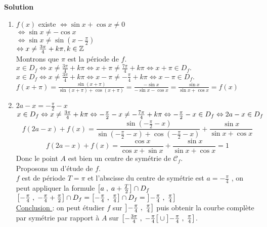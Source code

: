 \textbf{\color{blue}Solution}
\begin{enumerate}
\item $ f(x) $ existe    $\Leftrightarrow \sin x+\cos x \neq 0  $\\
 $\Leftrightarrow \sin x \neq -\cos x $\\
 $\Leftrightarrow \sin x \neq \sin (x- \frac{\pi}{2}) $\\
 $ \Leftrightarrow x\neq \frac{3\pi}{4}+ k\pi , k\in \mathbb{Z}$\\
 Montrons que $ \pi $ est la période de $ f. $\\
 $ x \in D_{f}\Leftrightarrow x\neq \frac{3\pi}{4}+ k\pi \Leftrightarrow x+\pi\neq \frac{7\pi}{4}+ k\pi \Leftrightarrow x+\pi\in D_{f}.$\\
  $ x \in D_{f}\Leftrightarrow x\neq \frac{3\pi}{4}+ k\pi \Leftrightarrow x-\pi\neq -\frac{\pi}{4}+ k\pi \Leftrightarrow x-\pi\in D_{f}.$\\
 $ f(x+\pi)=\frac{\sin (x+\pi) }{\sin (x+\pi)+\cos (x+\pi)}= \frac{-\sin x }{-\sin x-\cos x}=\frac{\sin x }{\sin x+\cos x}=f(x)$
 \item $ 2a-x=-\frac{\pi}{2}-x $\\
  $ x \in D_{f}\Leftrightarrow x\neq \frac{3\pi}{4}+ k\pi \Leftrightarrow -\frac{\pi}{2}-x \neq -\frac{7\pi}{4}+ k\pi \Leftrightarrow -\frac{\pi}{2}-x\in D_{f} \\\Leftrightarrow 2a-x\in D_{f}$
 $$ f(2a-x)+f(x)= \frac{\sin (-\frac{\pi}{2}-x ) }{\sin (-\frac{\pi}{2}-x )+\cos (-\frac{\pi}{2}-x )}+\frac{\sin x }{\sin x+\cos x} $$
 $$ f(2a-x)+f(x)= \frac{\cos x }{\cos x +\sin x }+\frac{\sin x }{\sin x+\cos x}=1 $$
 Donc le point $ A $ est bien un centre de symétrie de $ \mathcal{C}_{f} $.\\
 Proposons un d'étude   de $f. $\\
$ f $ est de période $ T= \pi$ et l'abscisse  du centre de symétrie est $ a=-\frac{\pi}{4}  $ , on peut appliquer la formule $ \left[a\;,\; a+\frac{T}{2}\right]\cap D_{f} $ \\
$ \left[-\frac{\pi}{4}\;,\; -\frac{\pi}{4}+\frac{\pi}{2}\right]\cap D_{f} =\left[-\frac{\pi}{4}\;,\; \frac{\pi}{4}\right]\cap D_{f}=\left]-\frac{\pi}{4} \;, \;\frac{\pi}{4}\right]$\\
\underline{Conclusion }: on peut étudier $ f $ sur $\left]-\frac{\pi}{4} \;, \;\frac{\pi}{4}\right]$ puis obtenir la courbe complète par symétrie par rapport à $ A $ sur $ \left[-\frac{3\pi}{4} \;,\; -\frac{\pi}{4}\right[\cup \left]-\frac{\pi}{4} \;, \;\frac{\pi}{4}\right] $.
 
 
\end{enumerate}


